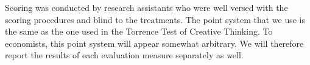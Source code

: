  



Scoring was conducted by research assistants who were well versed with the scoring procedures and blind to the treatments. 
The  point system that we use is the same as the one used in the Torrence Test
of Creative Thinking. To economists, this point system will appear somewhat arbitrary. We will therefore report the results of each evaluation measure separately as well. 

